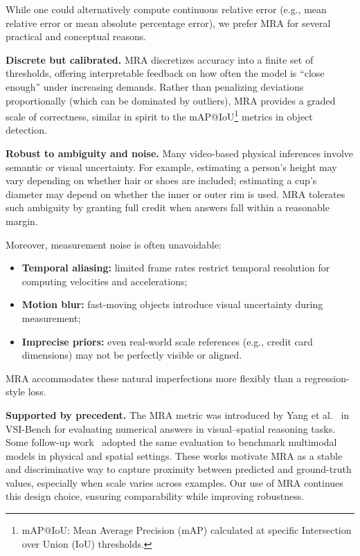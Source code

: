 While one could alternatively compute continuous relative error (e.g., mean relative error or mean absolute percentage error), we prefer MRA for several practical and conceptual reasons.

\noindent\textbf{Discrete but calibrated.}
MRA discretizes accuracy into a finite set of thresholds, offering interpretable feedback on how often the model is ``close enough'' under increasing demands.
Rather than penalizing deviations proportionally (which can be dominated by outliers), MRA provides a graded scale of correctness, similar in spirit to the mAP@IoU\footnote{mAP@IoU: Mean Average Precision (mAP) calculated at specific Intersection over Union (IoU) thresholds.} metrics in object detection.

\noindent\textbf{Robust to ambiguity and noise.}
Many video-based physical inferences involve semantic or visual uncertainty.
For example, estimating a person’s height may vary depending on whether hair or shoes are included;
estimating a cup’s diameter may depend on whether the inner or outer rim is used.
MRA tolerates such ambiguity by granting full credit when answers fall within a reasonable margin.

Moreover, measurement noise is often unavoidable:
\begin{itemize}
  \item \textbf{Temporal aliasing:} limited frame rates restrict temporal resolution for computing velocities and accelerations;
  \item \textbf{Motion blur:} fast-moving objects introduce visual uncertainty during measurement;
  \item \textbf{Imprecise priors:} even real-world scale references (e.g., credit card dimensions) may not be perfectly visible or aligned.
\end{itemize}
MRA accommodates these natural imperfections more flexibly than a regression-style loss.

\noindent\textbf{Supported by precedent.}
The MRA metric was introduced by Yang et al.~\cite{yang2025thinking} in VSI-Bench for evaluating numerical answers in visual–spatial reasoning tasks.
Some follow-up work~\cite{sridhar2025vreason, cai2025holistic} adopted the same evaluation to benchmark multimodal models in physical and spatial settings.
These works motivate MRA as a stable and discriminative way to capture proximity between predicted and ground-truth values, especially when scale varies across examples.
Our use of MRA continues this design choice, ensuring comparability while improving robustness.

